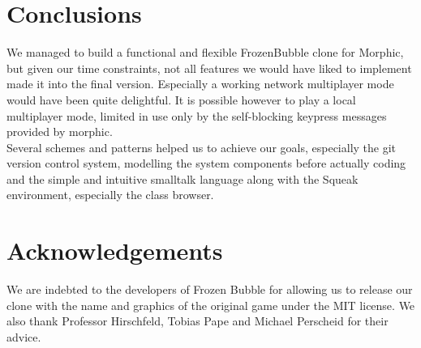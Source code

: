 \section{Conclusions}
We managed to build a functional and flexible FrozenBubble clone for Morphic,
but given our time constraints, not all features we would have liked to implement
made it into the final version. Especially a working network multiplayer mode would
have been quite delightful. It is possible however to play a local multiplayer mode,
limited in use only by the self-blocking keypress messages provided by morphic.\\
Several schemes and patterns helped us to achieve our goals, especially the git version
control system, modelling the system components before actually coding and the simple 
and intuitive smalltalk language along with the Squeak environment, especially the class
browser.

\section*{Acknowledgements}
We are indebted to the developers of Frozen Bubble for allowing us to release 
our clone with the name and graphics of the original game under the MIT 
license. We also thank Professor Hirschfeld, Tobias Pape and Michael Perscheid for 
their advice.